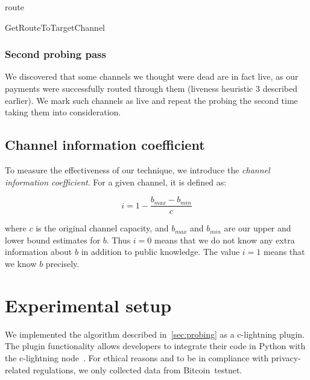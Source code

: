 \begin{algorithm}
	 {
	}
	\Return route\;
	\caption{GetRouteToTargetChannel}
	\label{alg:find-route}
\end{algorithm}

\subsubsection*{Second probing pass}
We discovered that some channels we thought were dead are in fact live, as our payments were successfully routed through them (liveness heuristic 3 described earlier).
We mark such channels as live and repeat the probing the second time taking them into consideration.

\subsection{Channel information coefficient}
To measure the effectiveness of our technique, we introduce the \textit{channel information coefficient}.
For a given channel, it is defined as:

\[i = 1 - \frac{b_{max} - b_{min}}{c}\]

where $c$ is the original channel capacity, and $b_{max}$ and $b_{min}$ are our upper and lower bound estimates for $b$.
Thus $i=0$ means that we do not know any extra information about $b$ in addition to public knowledge.
The value $i=1$ means that we know $b$ precisely.





\section{Experimental setup}

We implemented the algorithm described in~\cref{sec:probing} as a c-lightning plugin.
The plugin functionality allows developers to integrate their code in Python with the c-lightning node~\cite{clightningPlugins}.
For ethical reasons and to be in compliance with privacy-related regulations, we only collected data from Bitcoin~testnet.

